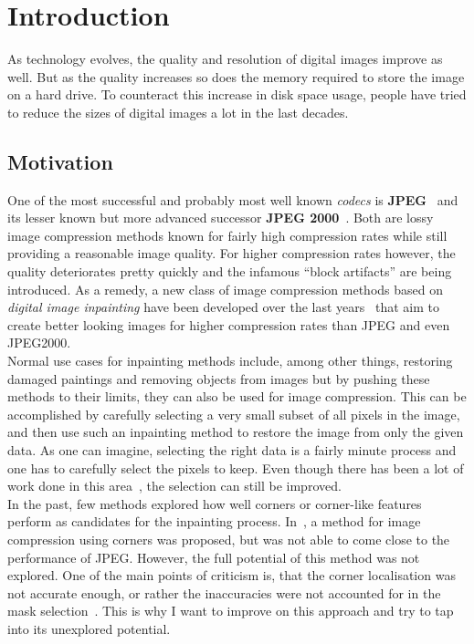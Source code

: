 \chapter{Introduction}\label{ch:Intro}
As technology evolves, the quality and resolution of digital images improve as well. But as the
quality increases so does the memory required to store the image on a hard drive. To counteract
this increase in disk space usage, people have tried to reduce the sizes of digital images a lot in the
last decades.

\section{Motivation}
One of the most successful and probably most well known \textit{codecs}
is \textbf{JPEG}~\cite{wallace92} and its lesser known but more advanced successor \textbf{JPEG
2000}~\cite{jpeg2000}. Both are lossy image compression methods
known for fairly high compression rates while still providing a reasonable image quality.
For higher compression rates however, the quality deteriorates pretty quickly and the infamous ``block
artifacts'' are being introduced. As a remedy, a new class of image compression methods based on
\textit{digital image inpainting} have been developed over the last
years~\cite{galic05, galic08, mainberger12, zimmer07, mainberger09, mainberger10, dong07, schmaltz09} that
aim to create better looking images for higher compression rates than JPEG and even JPEG2000. \\
Normal use cases for inpainting methods include, among other things, restoring damaged paintings and removing 
objects from images but by pushing these methods to their limits, they can also be used for image compression.
This can be accomplished by carefully selecting a very small subset of all pixels in the image, 
and then use such an inpainting method to restore the image from only the given data.
As one can imagine, selecting the right data is a fairly minute process and one has to carefully
select the pixels to keep. Even though there has been a lot of work done in this
area~\cite{belhachmi09, schmaltz14, hoeltgen12}, the
selection can still be improved.\\
In the past, few methods explored how well corners or corner-like features perform as candidates for
the inpainting process. In~\cite{zimmer07}, a method for image compression using corners was
proposed, but was not able to come close to the performance of JPEG\@.
However, the full potential of this method was not explored. \newpage\noindent
One of the main points of criticism is,
that the corner localisation was not accurate enough, or rather the inaccuracies were not accounted 
for in the mask selection~\cite{conversation}. This is why I want to improve on this approach and try 
to tap into its unexplored potential.

